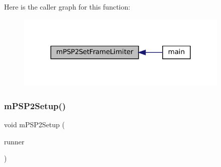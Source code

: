 Here is the caller graph for this function\+:
\nopagebreak
\begin{figure}[H]
\begin{center}
\leavevmode
\includegraphics[width=288pt]{psp2-context_8c_a9a298ef5f14d11b2cf482a19a3a55d82_icgraph}
\end{center}
\end{figure}
\mbox{\label{psp2-context_8c_a421c14012a9792c249822f943155921a}} 
\subsubsection{\texorpdfstring{m\+P\+S\+P2\+Setup()}{mPSP2Setup()}}
{\footnotesize\ttfamily void m\+P\+S\+P2\+Setup (\begin{DoxyParamCaption}\item[{struct \mbox{\hyperlink{structm_g_u_i_runner}{m\+G\+U\+I\+Runner}} $\ast$}]{runner }\end{DoxyParamCaption})}

